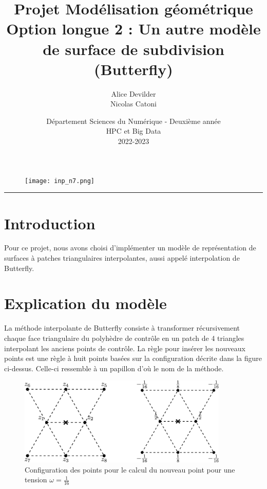 \documentclass{article}
\begin{document}
\begin{figure}[t]
\centering\texttt{[image: inp\_n7.png]}
\end{figure}

\title{\vspace{4cm} \textbf{Projet Modélisation géométrique}
\\ Option longue 2 : Un autre modèle de surface de subdivision (Butterfly)}
\author{Alice Devilder \\ Nicolas Catoni}

\date{\vspace{7cm} Département Sciences du Numérique - Deuxième année \\
HPC et Big Data \\ 2022-2023 }

\maketitle

\begin{center}
 \rule{0.5\linewidth}{1pt}
 \end{center}

 

\newpage

\section{Introduction}

Pour ce projet, nous avons choisi d'implémenter un modèle de représentation de surfaces à patches triangulaires interpolantes, aussi appelé interpolation de Butterfly. 

\section{Explication du modèle}

La méthode interpolante de Butterfly consiste à transformer récursivement chaque face triangulaire du polyhèdre de contrôle en un patch de 4 triangles interpolant les anciens points de contrôle. La règle pour insérer les nouveaux points est une règle à huit points basées sur la configuration décrite dans la figure ci-dessus. Celle-ci ressemble à un papillon d'où le nom de la méthode. \\

\begin{figure}[h]
\centering
    \includegraphics[width=10cm]{img_butterfly_2.jpg}
    \caption{Configuration des points pour le calcul du nouveau point pour une tension $\omega = \frac{1}{16}$}
\end{figure}
\end{document}
